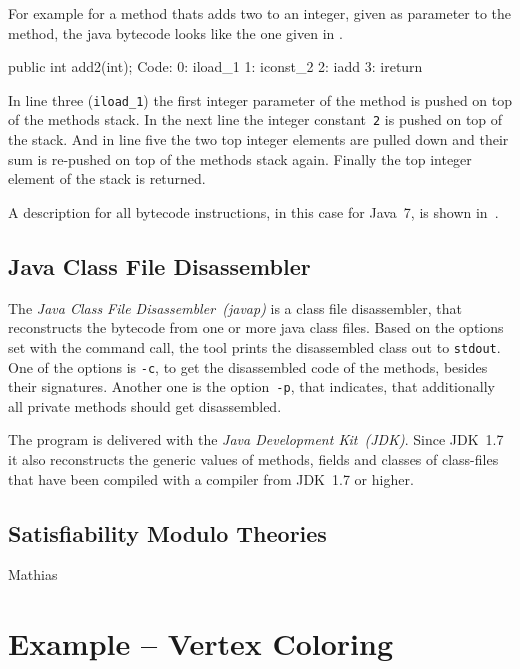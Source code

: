 \documentclass[conference]{IEEEtran}
\begin{document}
For example for a method thats adds two to an integer, given as parameter to
the method, the java bytecode looks like the one given in
.

\begin{javalisting}[caption=Java bytecode list for a Method that adds up 2,
    label=lst:example_bytecode_add_up_2]
public int add2(int);
  Code:
   0: iload_1
   1: iconst_2
   2: iadd
   3: ireturn
\end{javalisting}

In line three (\texttt{iload\_1}) the first integer parameter of the method is
pushed on top of the methods stack. In the next line the integer
constant~\texttt{2} is pushed on top of the stack. And in line five the two top
integer elements are pulled down and their sum is re-pushed on top of the
methods stack again. Finally the top integer element of the stack is returned.

A description for all bytecode instructions, in this case for Java~7, is shown
in~\cite{LindholmYBB11}.

\subsection{Java Class File Disassembler}
\label{sec:prelim_javap}

The \emph{Java Class File Disassembler~(javap)} is a class file disassembler,
that reconstructs the bytecode from one or more java class files. Based on the
options set with the command call, the tool prints the disassembled class out
to \texttt{stdout}. One of the options is \texttt{-c}, to get the disassembled
code of the methods, besides their signatures. Another one is the
option~\texttt{-p}, that indicates, that additionally all private methods
should get disassembled.

The program is delivered with the \emph{Java Development Kit~(JDK)}. Since
JDK~1.7 it also reconstructs the generic values of methods, fields and classes
of class-files that have been compiled with a compiler from JDK~1.7 or higher.

\subsection{Satisfiability Modulo Theories}
\label{sec:prelim_smt}

\danger Mathias

\section{Example -- Vertex Coloring}
\label{sec:example_vertex_coloring}
\end{document}
